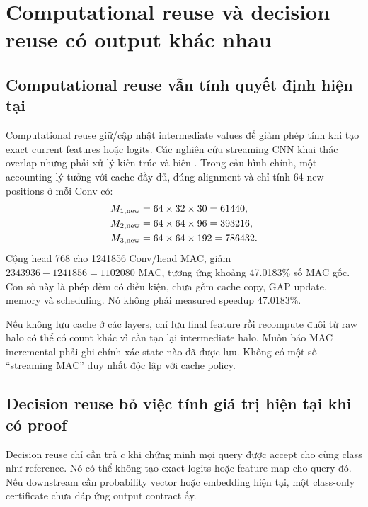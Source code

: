 \documentclass[11pt,a4paper]{article}
\theoremstyle{definition}
\begin{document}
\section{Computational reuse và decision reuse có output khác nhau}
\subsection{Computational reuse vẫn tính quyết định hiện tại}
Computational reuse giữ/cập nhật intermediate values để giảm phép tính
khi tạo exact current features hoặc logits. Các nghiên cứu streaming
CNN khai thác overlap nhưng phải xử lý kiến trúc và biên \cite{streaminnc}.
Trong cấu hình chính, một accounting lý tưởng với cache đầy đủ, đúng
alignment và chỉ tính 64 new positions ở mỗi Conv có:
\begin{align}
M_{1,\rm new}&=64\times32\times30=61440,\\
M_{2,\rm new}&=64\times64\times96=393216,\\
M_{3,\rm new}&=64\times64\times192=786432.
\end{align}
Cộng head 768 cho 1241856 Conv/head MAC, giảm
$2343936-1241856=1102080$ MAC, tương ứng khoảng 47.0183\% số MAC gốc.
Con số này là phép đếm có điều kiện, chưa gồm cache copy, GAP update,
memory và scheduling. Nó không phải measured speedup 47.0183\%.

Nếu không lưu cache ở các layers, chỉ lưu final feature rồi recompute
đuôi từ raw halo có thể có count khác vì cần tạo lại intermediate halo.
Muốn báo MAC incremental phải ghi chính xác state nào đã được lưu.
Không có một số ``streaming MAC'' duy nhất độc lập với cache policy.

\subsection{Decision reuse bỏ việc tính giá trị hiện tại khi có proof}
Decision reuse chỉ cần trả $c$ khi chứng minh mọi query được accept cho
cùng class như reference. Nó có thể không tạo exact logits hoặc feature
map cho query đó. Nếu downstream cần probability vector hoặc embedding
hiện tại, một class-only certificate chưa đáp ứng output contract ấy.
\end{document}

